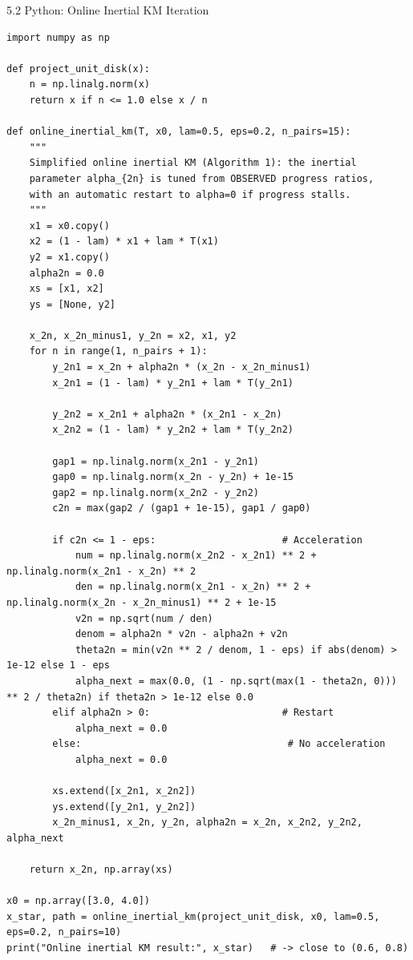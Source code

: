 \documentclass[aspectratio=169,10pt]{beamer}
\begin{document}
\begin{frame}[fragile]{5.2 Python: Online Inertial KM Iteration}
\begin{lstlisting}[caption={Online inertial KM iteration with restart (Python/NumPy)}]
import numpy as np

def project_unit_disk(x):
    n = np.linalg.norm(x)
    return x if n <= 1.0 else x / n

def online_inertial_km(T, x0, lam=0.5, eps=0.2, n_pairs=15):
    """
    Simplified online inertial KM (Algorithm 1): the inertial
    parameter alpha_{2n} is tuned from OBSERVED progress ratios,
    with an automatic restart to alpha=0 if progress stalls.
    """
    x1 = x0.copy()
    x2 = (1 - lam) * x1 + lam * T(x1)
    y2 = x1.copy()
    alpha2n = 0.0
    xs = [x1, x2]
    ys = [None, y2]

    x_2n, x_2n_minus1, y_2n = x2, x1, y2
    for n in range(1, n_pairs + 1):
        y_2n1 = x_2n + alpha2n * (x_2n - x_2n_minus1)
        x_2n1 = (1 - lam) * y_2n1 + lam * T(y_2n1)

        y_2n2 = x_2n1 + alpha2n * (x_2n1 - x_2n)
        x_2n2 = (1 - lam) * y_2n2 + lam * T(y_2n2)

        gap1 = np.linalg.norm(x_2n1 - y_2n1)
        gap0 = np.linalg.norm(x_2n - y_2n) + 1e-15
        gap2 = np.linalg.norm(x_2n2 - y_2n2)
        c2n = max(gap2 / (gap1 + 1e-15), gap1 / gap0)

        if c2n <= 1 - eps:                      # Acceleration
            num = np.linalg.norm(x_2n2 - x_2n1) ** 2 + np.linalg.norm(x_2n1 - x_2n) ** 2
            den = np.linalg.norm(x_2n1 - x_2n) ** 2 + np.linalg.norm(x_2n - x_2n_minus1) ** 2 + 1e-15
            v2n = np.sqrt(num / den)
            denom = alpha2n * v2n - alpha2n + v2n
            theta2n = min(v2n ** 2 / denom, 1 - eps) if abs(denom) > 1e-12 else 1 - eps
            alpha_next = max(0.0, (1 - np.sqrt(max(1 - theta2n, 0))) ** 2 / theta2n) if theta2n > 1e-12 else 0.0
        elif alpha2n > 0:                       # Restart
            alpha_next = 0.0
        else:                                    # No acceleration
            alpha_next = 0.0

        xs.extend([x_2n1, x_2n2])
        ys.extend([y_2n1, y_2n2])
        x_2n_minus1, x_2n, y_2n, alpha2n = x_2n, x_2n2, y_2n2, alpha_next

    return x_2n, np.array(xs)

x0 = np.array([3.0, 4.0])
x_star, path = online_inertial_km(project_unit_disk, x0, lam=0.5, eps=0.2, n_pairs=10)
print("Online inertial KM result:", x_star)   # -> close to (0.6, 0.8)
\end{lstlisting}
\end{frame}
\end{document}
